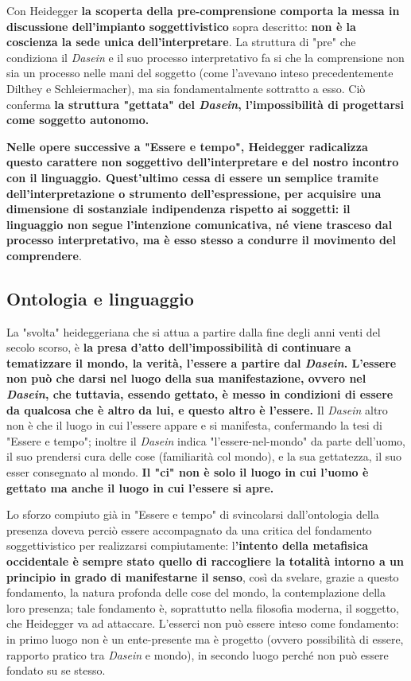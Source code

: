 Con Heidegger \textbf{la scoperta della pre-comprensione comporta
la messa in discussione dell'impianto soggettivistico}
sopra descritto: \textbf{non è la coscienza la sede unica dell'interpretare}. La struttura di "pre" che condiziona
il \textit{Dasein} e il suo processo interpretativo fa si che
la comprensione non sia un processo nelle mani del
soggetto (come l'avevano inteso precedentemente Dilthey e
Schleiermacher), ma sia fondamentalmente sottratto a
esso. Ciò conferma \textbf{la struttura "gettata" del
\textit{Dasein}, l'impossibilità di progettarsi come soggetto
autonomo.}

\textbf{Nelle opere successive a "Essere e tempo",
Heidegger radicalizza questo carattere non
soggettivo dell'interpretare e del nostro incontro
con il linguaggio. Quest'ultimo cessa di essere
un semplice tramite dell'interpretazione o strumento
dell'espressione, per acquisire una dimensione di
sostanziale indipendenza rispetto ai soggetti: il linguaggio
non segue l'intenzione comunicativa, né viene
trasceso dal processo interpretativo, ma è esso stesso a
condurre il movimento del comprendere}.

\subsection{Ontologia e linguaggio}

La "svolta" heideggeriana che si attua a partire
dalla fine degli anni venti del secolo scorso, è \textbf{la
presa d'atto dell'impossibilità di continuare a
tematizzare il mondo, la verità, l'essere a partire
dal \textit{Dasein}. L'essere non può che darsi nel luogo della
sua manifestazione, ovvero nel \textit{Dasein}, che tuttavia,
essendo gettato, è messo in condizioni di essere da
qualcosa che è altro da lui, e questo altro è l'essere.}
Il \textit{Dasein} altro non è che il luogo in cui l'essere appare
e si manifesta, confermando la tesi di "Essere e tempo";
inoltre il \textit{Dasein} indica "l'essere-nel-mondo" da parte
dell'uomo, il suo prendersi cura delle cose (familiarità
col mondo), e la sua gettatezza, il suo esser consegnato
al mondo. \textbf{Il "ci" non è solo il luogo in cui
l'uomo è gettato ma anche il luogo in cui l'essere si apre.}

Lo sforzo compiuto già in "Essere e tempo" di svincolarsi
dall'ontologia della presenza doveva perciò essere accompagnato da una critica del fondamento soggettivistico per
realizzarsi compiutamente: l\textbf{'intento della metafisica
occidentale è sempre stato quello di raccogliere la
totalità intorno a un principio in grado
di manifestarne il senso}, così da svelare, grazie a
questo fondamento, la natura profonda delle cose del
mondo, la contemplazione della loro presenza; tale
fondamento è, soprattutto nella filosofia moderna, il
soggetto, che Heidegger va ad attaccare.
L'esserci non può essere inteso come fondamento: in
primo luogo non è un ente-presente ma è progetto
(ovvero possibilità di essere, rapporto pratico tra \textit{Dasein} e mondo), in secondo luogo
perché non può essere fondato su se stesso.

